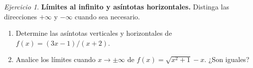 \documentclass[12pt]{article}
\theoremstyle{remark}
\newtheorem{Ejer}{Ejercicio}
\begin{document}
\begin{Ejer}\textbf{Límites al infinito y asíntotas horizontales.} Distinga las direcciones $+\infty$ y $-\infty$ cuando sea necesario.
\begin{enumerate}[resume=banco]
\item Determine las asíntotas verticales y horizontales de $f(x)=(3x-1)/(x+2)$.
\item Analice los límites cuando $x\to\pm\infty$ de $f(x)=\sqrt{x^2+1}-x$. ¿Son iguales?
\end{enumerate}
\end{Ejer}
\end{document}
